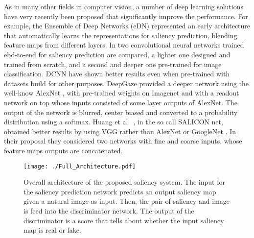 \documentclass[times,twocolumn,final,authoryear]{elsarticle}
\begin{document}
As in many other fields in computer vision, a number of deep learning solutions have very recently been proposed that significantly improve the performance.
For example, the Ensemble of Deep Networks (eDN) \citep{vig2014large} represented an early architecture that automatically learns the representations for saliency prediction, blending feature maps from different layers. 
In \citep{Pan_2016_CVPR} two convolutional neural networks trained ebd-to-end for saliency prediction are compared, a lighter one designed and trained from scratch, and a second and deeper one pre-trained for image classification. DCNN have shown better results even when pre-trained with datasets build for other purposes. DeepGaze \cite{kummerer2015deep} provided a deeper network using the well-know AlexNet \citep{krizhevsky2012imagenet}, with pre-trained weights on Imagenet \citep{deng2009imagenet} and with a readout network on top whose inputs consisted of some layer outputs of AlexNet. The output of the network is blurred, center biased and converted to a probability distribution using a softmax. Huang et al.~\citep{huang2015salicon}, in the so call SALICON net, obtained better results by using VGG rather than AlexNet or GoogleNet \citep{Szegedy2015}. In their proposal they considered two networks with fine and coarse inputs, whose feature maps outputs are concatenated.

\begin{figure*}[!ht]
\texttt{[image: ./Full\_Architecture.pdf]}
 \caption{Overall architecture of the proposed saliency system. The input for the saliency prediction network predicts an output saliency map given a natural image as input. Then, the pair of saliency and image is feed into the discriminator network. The output of the discriminator is a score that tells about whether the input saliency map is real or fake.} %
\label{fig:architecture}
\end{figure*}
\end{document}
